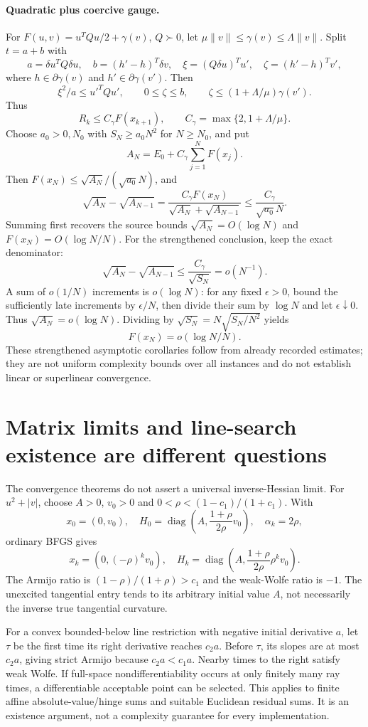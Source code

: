 \paragraph{Quadratic plus coercive gauge.}
For $F(u,v)=u^TQu/2+\gamma(v)$, $Q\succ0$, let $\mu\|v\|\le\gamma(v)\le\Lambda\|v\|$. Split $t=a+b$ with
\[
 a=\delta u^TQ\delta u,\quad b=(h'-h)^T\delta v,\quad
 \xi=(Q\delta u)^Tu',\quad\zeta=(h'-h)^Tv',
\]
where $h\in\partial\gamma(v)$ and $h'\in\partial\gamma(v')$. Then
\[
 \xi^2/a\le u'^TQu',\qquad0\le\zeta\le b,
 \qquad\zeta\le(1+\Lambda/\mu)\gamma(v').
\]
Thus
\[
 R_k\le C_\gamma F(x_{k+1}),\qquad
 C_\gamma=\max\{2,1+\Lambda/\mu\}.
\]
Choose $a_0>0,N_0$ with $S_N\ge a_0N^2$ for $N\ge N_0$, and put
\[
 A_N=E_0+C_\gamma\sum_{j=1}^NF(x_j).
\]
Then $F(x_N)\le\sqrt{A_N}/(\sqrt{a_0}N)$, and
\[
 \sqrt{A_N}-\sqrt{A_{N-1}}
 =\frac{C_\gamma F(x_N)}{\sqrt{A_N}+\sqrt{A_{N-1}}}
 \le\frac{C_\gamma}{\sqrt{a_0}N}.
\]
Summing first recovers the source bounds $\sqrt{A_N}=O(\log N)$ and $F(x_N)=O(\log N/N)$. For the strengthened conclusion, keep the exact denominator:
\[
 \sqrt{A_N}-\sqrt{A_{N-1}}\le \frac{C_\gamma}{\sqrt{S_N}}=o(N^{-1}).
\]
A sum of $o(1/N)$ increments is $o(\log N)$: for any fixed $\epsilon>0$, bound the sufficiently late increments by $\epsilon/N$, then divide their sum by $\log N$ and let $\epsilon\downarrow0$. Thus $\sqrt{A_N}=o(\log N)$. Dividing by $\sqrt{S_N}=N\sqrt{S_N/N^2}$ yields
\[
 \boxed{F(x_N)=o(\log N/N).}
\]
These strengthened asymptotic corollaries follow from already recorded estimates; they are not uniform complexity bounds over all instances and do not establish linear or superlinear convergence.

\section{Matrix limits and line-search existence are different questions}
The convergence theorems do not assert a universal inverse-Hessian limit. For $u^2+|v|$, choose $A>0$, $v_0>0$ and $0<\rho<(1-c_1)/(1+c_1)$. With
\[
 x_0=(0,v_0),\quad
 H_0=\operatorname{diag}\left(A,\frac{1+\rho}{2\rho}v_0\right),\quad\alpha_k=2\rho,
\]
ordinary BFGS gives
\[
 x_k=(0,(-\rho)^kv_0),\quad
 H_k=\operatorname{diag}\left(A,\frac{1+\rho}{2\rho}\rho^kv_0\right).
\]
The Armijo ratio is $(1-\rho)/(1+\rho)>c_1$ and the weak-Wolfe ratio is $-1$. The unexcited tangential entry tends to its arbitrary initial value $A$, not necessarily the inverse true tangential curvature.

For a convex bounded-below line restriction with negative initial derivative $a$, let $\tau$ be the first time its right derivative reaches $c_2a$. Before $\tau$, its slopes are at most $c_2a$, giving strict Armijo because $c_2a<c_1a$. Nearby times to the right satisfy weak Wolfe. If full-space nondifferentiability occurs at only finitely many ray times, a differentiable acceptable point can be selected. This applies to finite affine absolute-value/hinge sums and suitable Euclidean residual sums. It is an existence argument, not a complexity guarantee for every implementation.

